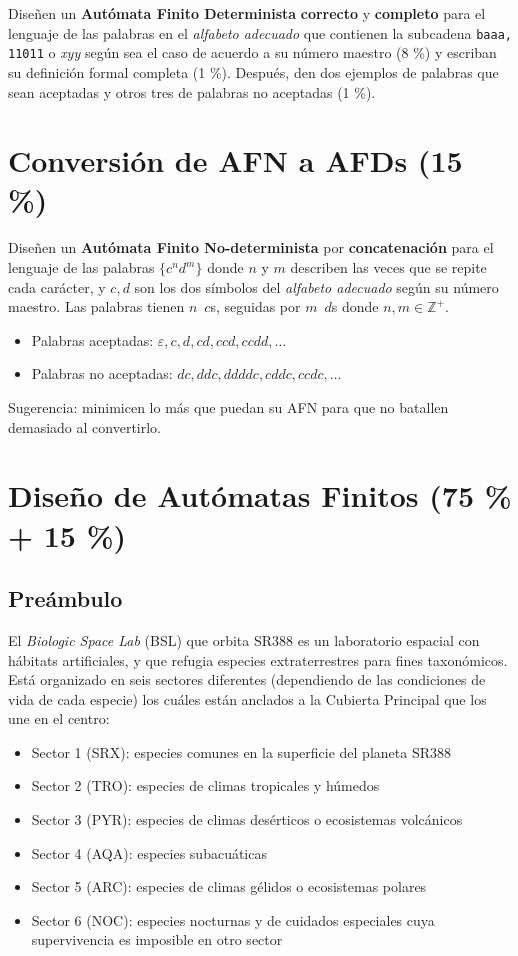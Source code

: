 \documentclass[8pt, onside]{article}
\begin{document}
Diseñen un \textbf{Autómata Finito Determinista} \textbf{correcto} y \textbf{completo} para el lenguaje de las palabras en el \textit{alfabeto adecuado} que contienen la subcadena \texttt{baaa, 11011} o \textit{xyy} según sea el caso de acuerdo a su número maestro (8 \%) y escriban su definición formal completa (1 \%).
Después, den dos ejemplos de palabras que sean aceptadas y otros tres de palabras no aceptadas (1 \%).


\section{Conversión de AFN a AFDs (15 \%)}

Diseñen un \textbf{Autómata Finito No-determinista} por \textbf{concatenación} para el lenguaje de las palabras $\{c^n d^m\}$ donde $n$ y $m$ describen las veces que se repite cada carácter, y $c,d$ son los dos símbolos del \textit{alfabeto adecuado} según su número maestro.
Las palabras tienen $n \,$ $c$s, seguidas por $m \,$ $d$s donde $n, m \in \mathbb{Z}^{+}$.

\begin{itemize}
    \item Palabras aceptadas: $\varepsilon, c, d, cd, ccd, ccdd, \dots$
    \item Palabras no aceptadas: $dc, ddc, ddddc, cddc, ccdc, \dots$
\end{itemize}

Sugerencia: minimicen lo más que puedan su AFN para que no batallen demasiado al convertirlo.

\section{Diseño de Autómatas Finitos (75 \% + 15 \%)}

\subsection*{Preámbulo}

El \textit{Biologic Space Lab} (BSL) que orbita \textsc{SR388} es un laboratorio espacial con hábitats artificiales, y que refugia especies extraterrestres para fines taxonómicos. Está organizado en seis sectores diferentes (dependiendo de las condiciones de vida de cada especie) los cuáles están anclados a la Cubierta Principal que los une en el centro:

\begin{itemize}
    \itemsep0em
    \item Sector 1 (SRX): especies comunes en la superficie del planeta SR388
    \item Sector 2 (TRO): especies de climas tropicales y húmedos
    \item Sector 3 (PYR): especies de climas desérticos o ecosistemas volcánicos
    \item Sector 4 (AQA): especies subacuáticas
    \item Sector 5 (ARC): especies de climas gélidos o ecosistemas polares
    \item Sector 6 (NOC): especies nocturnas y de cuidados especiales cuya supervivencia es imposible en otro sector
\end{itemize}
\end{document}
